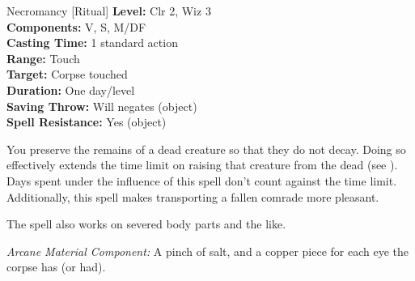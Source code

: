 {Necromancy [Ritual]}
{
	\textbf{Level:}
	Clr 2, Wiz 3\\
	\textbf{Components:}
	V, S, M/DF\\
	\textbf{Casting Time:}
	1 standard action\\
	\textbf{Range:}
	Touch\\
	\textbf{Target:}
	Corpse touched\\
	\textbf{Duration:}
	One day/level\\
	\textbf{Saving Throw:}
	Will negates (object)\\
	\textbf{Spell Resistance:}
	Yes (object)\\
}
{
	You preserve the remains of a dead creature so that they do not decay. Doing so effectively extends the time limit on raising that creature from the dead (see ). Days spent under the influence of this spell don't count against the time limit. Additionally, this spell makes transporting a fallen comrade more pleasant.

	The spell also works on severed body parts and the like.

	\textit{Arcane Material Component:}
	A pinch of salt, and a copper piece for each eye the corpse has (or had).

}
